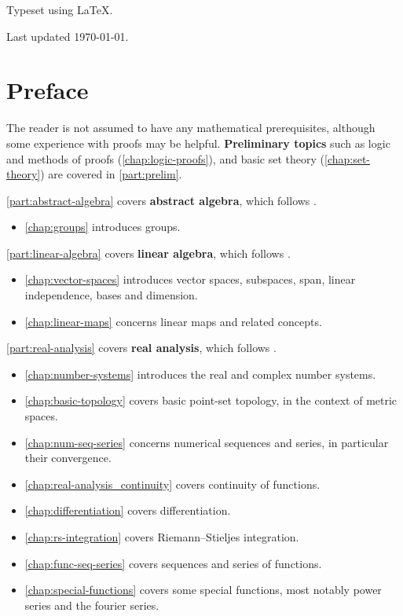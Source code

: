 Typeset using \LaTeX.

Last updated \today.
\pagebreak

\frontmatter
\section*{Preface}
\ifprelim
The reader is not assumed to have any mathematical prerequisites, although some experience with proofs may be helpful. \textbf{Preliminary topics} such as logic and methods of proofs (\cref{chap:logic-proofs}), and basic set theory (\cref{chap:set-theory}) are covered in \cref{part:prelim}.
\fi

\ifabsalg
\cref{part:abstract-algebra} covers \textbf{abstract algebra}, which follows \cite{dummit-foote,artin}.
\begin{itemize}
\item \cref{chap:groups} introduces groups.
\end{itemize}
\fi

\iflinalg
\cref{part:linear-algebra} covers \textbf{linear algebra}, which follows \cite{axler}.
\begin{itemize}
\item \cref{chap:vector-spaces} introduces vector spaces, subspaces, span, linear independence, bases and dimension.
\item \cref{chap:linear-maps} concerns linear maps and related concepts.
\end{itemize}
\fi

\ifanalysis
\cref{part:real-analysis} covers \textbf{real analysis}, which follows \cite{rudin,apostol}.
\begin{itemize}
\item \cref{chap:number-systems} introduces the real and complex number systems.
\item \cref{chap:basic-topology} covers basic point-set topology, in the context of metric spaces.
\item \cref{chap:num-seq-series} concerns numerical sequences and series, in particular their convergence.
\item \cref{chap:real-analysis_continuity} covers continuity of functions.
\item \cref{chap:differentiation} covers differentiation.
\item \cref{chap:rs-integration} covers Riemann--Stieljes integration.
\item \cref{chap:func-seq-series} covers sequences and series of functions.
\item \cref{chap:special-functions} covers some special functions, most notably power series and the fourier series.
\end{itemize}
\fi

